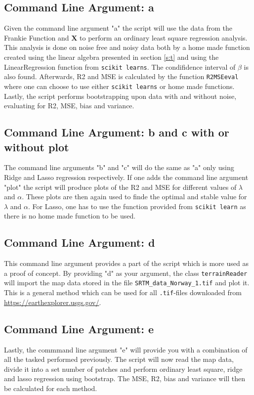 \documentclass[12pt]{article}
\begin{document}
\subsection{Command Line Argument: a}
Given the command line argument "a" the script will use the data from the Frankie Function and $\bm{X}$ to perform an ordinary least square regression analysis. This analysis is done on noise free and noisy data both by a home made function created using the linear algebra presented in section \ref{s:t} and using the LinearRegression function from \texttt{scikit learns}. The condifidence interval of $\beta$ is also found. Afterwards, R2 and MSE is calculated by the function \texttt{R2MSEeval} where one can choose to use either \texttt{scikit learns} or home made functions. Lastly, the script performs bootstrapping upon data with and without noise, evaluating for R2, MSE, bias and variance.
\subsection{Command Line Argument: b and c with or without plot}
The command line arguments "b" and "c" will do the same as "a" only using Ridge and Lasso regression respectively. If one adds the command line argument "plot" the script will produce plots of the R2 and MSE for different values of $\lambda$ and $\alpha$. These plots are then again used to finde the optimal and stable value for $\lambda$ and $\alpha$. For Lasso, one has to use the function provided from \texttt{scikit learn} as there is no home made function to be used.
\subsection{Command Line Argument: d}
This command line argument provides a part of the script which is more used as a proof of concept. By providing "d" as your argument, the class \texttt{terrainReader} will import the map data stored in the file \texttt{SRTM\_data\_Norway\_1.tif} and plot it. This is a general method which can be used for all \texttt{.tif}-files downloaded from \url{https://earthexplorer.usgs.gov/}.
\subsection{Command Line Argument: e}
Lastly, the commmand line argument "e" will provide you with a combination of all the tasked performed previously. The script will now read the map data, divide it into a set number of patches and perform ordinary least square, ridge and lasso regression using bootstrap. The MSE, R2, bias and variance will then be calculated for each method.
\end{document}
